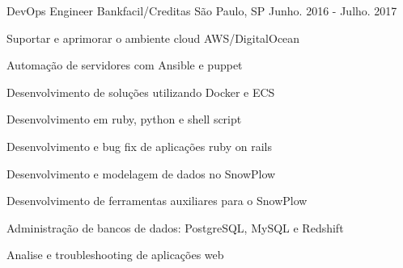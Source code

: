 \begin{cventries}
  \cventry
    {DevOps Engineer} %
    {Bankfacil/Creditas} %
    {São Paulo, SP} %
    {Junho. 2016 - Julho. 2017} %
    {
      \begin{cvitems} %
        \item {Suportar e aprimorar o ambiente cloud AWS/DigitalOcean}
        \item {Automação de servidores com Ansible e puppet}
    \item {Desenvolvimento de soluções utilizando Docker e ECS}
	\item {Desenvolvimento em ruby, python e shell script}
	\item {Desenvolvimento e bug fix de aplicações ruby on rails}
	\item {Desenvolvimento e modelagem de dados no SnowPlow}
	\item {Desenvolvimento de ferramentas auxiliares para o SnowPlow}
	\item {Administração de bancos de dados: PostgreSQL, MySQL e Redshift}
        \item {Analise e troubleshooting de aplicações web}
      \end{cvitems}
    }


\end{cventries}

